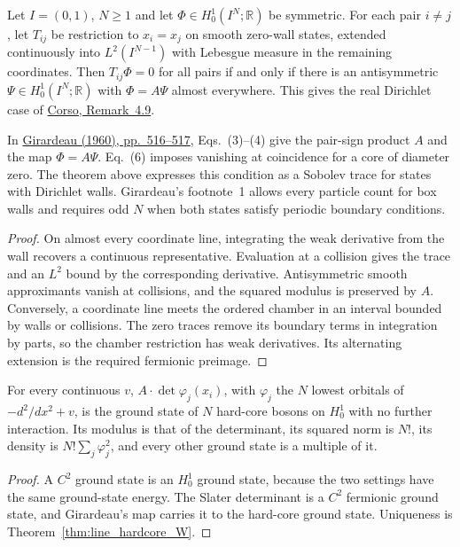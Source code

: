 \begin{theorem}
  \label{thm:line_girardeau_trace}
  \leanok
  Let $I=(0,1)$, $N\geq1$ and let $\Phi\in H^1_0(I^N;\mathbb R)$ be symmetric.
  For each pair $i\ne j$, let $T_{ij}$ be restriction to $x_i=x_j$ on smooth
  zero-wall states, extended continuously into $L^2(I^{N-1})$ with Lebesgue
  measure in the remaining coordinates. Then $T_{ij}\Phi=0$ for all pairs
  if and only if there is an antisymmetric $\Psi\in H^1_0(I^N;\mathbb R)$
  with $\Phi=A\Psi$ almost everywhere. This gives the real Dirichlet case of
  \href{https://doi.org/10.1007/s00023-026-01693-0}{Corso, Remark~4.9}.
\end{theorem}
\noindent
In \href{https://doi.org/10.1063/1.1703687}{Girardeau (1960), pp.~516--517},
Eqs.~(3)--(4) give the pair-sign product $A$ and the map $\Phi=A\Psi$.
Eq.~(6) imposes vanishing at coincidence for a core of diameter zero.
The theorem above expresses this condition as a Sobolev trace for states with Dirichlet walls.
Girardeau's footnote~1 allows every particle count for box walls and requires odd $N$
when both states satisfy periodic boundary conditions.
\begin{proof}
  \leanok
  On almost every coordinate line, integrating the weak derivative from the
  wall recovers a continuous representative. Evaluation at a collision gives
  the trace and an $L^2$ bound by the corresponding derivative. Antisymmetric
  smooth approximants vanish at collisions, and the squared modulus is preserved
  by $A$. Conversely, a coordinate line meets the ordered chamber in an interval
  bounded by walls or collisions. The zero traces remove its boundary terms in
  integration by parts, so the chamber restriction has weak derivatives. Its
  alternating extension is the required fermionic preimage.
\end{proof}

\begin{theorem}
  \label{thm:tonks_W}
  \leanok
  For every continuous $v$, $A\cdot\det\varphi_j(x_i)$, with $\varphi_j$ the $N$ lowest orbitals of $-d^2/dx^2+v$, is
  the ground state of $N$ hard-core bosons on $H^1_0$ with no further interaction. Its modulus is that of the
  determinant, its squared norm is $N!$, its density is $N!\sum_j\varphi_j^2$, and every other ground state is a multiple of
  it.
\end{theorem}
\begin{proof}
  \leanok
  A $C^2$ ground state is an $H^1_0$ ground state, because the two settings have the same ground-state energy. The
  Slater determinant is a $C^2$ fermionic ground state, and Girardeau's map carries it to the hard-core ground state.
  Uniqueness is Theorem~\ref{thm:line_hardcore_W}.
\end{proof}

